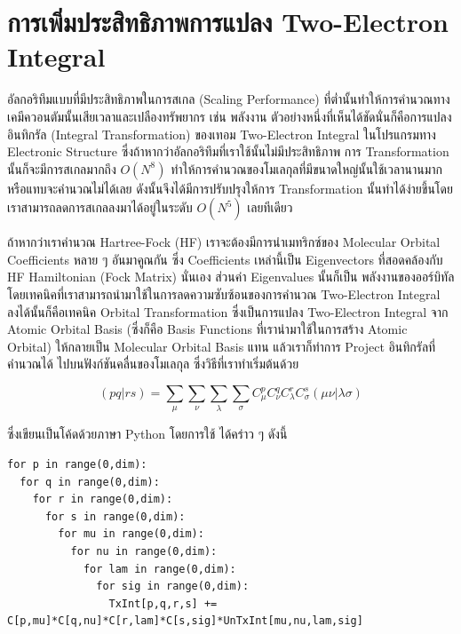 \section{การเพิ่มประสิทธิภาพการแปลง Two-Electron Integral}

อัลกอริทึมแบบที่มีประสิทธิภาพในการสเกล (Scaling Performance) ที่ต่ำนั้นทำให้การคำนวณทางเคมีควอนตัมนั้นเสียเวลาและเปลืองทรัพยากร เช่น
พลังงาน ตัวอย่างหนึ่งที่เห็นได้ชัดนั่นก็คือการแปลงอินทิกรัล (Integral Transformation) ของเทอม Two-Electron Integral ในโปรแกรมทาง
Electronic Structure ซึ่งถ้าหากว่าอัลกอริทึมที่เราใช้นั้นไม่มีประสิทธิภาพ การ Transformation นั้นก็จะมีการสเกลมากถึง $O(N^{8})$
ทำให้การคำนวณของโมเลกุลที่มีขนาดใหญ่นั้นใช้เวลานานมากหรือแทบจะคำนวณไม่ได้เลย ดังนั้นจึงได้มีการปรับปรุงให้การ Transformation
นั้นทำได้ง่ายขึ้นโดยเราสามารถลดการสเกลลงมาได้อยู่ในระดับ $O(N^{5})$ เลยทีเดียว

ถ้าหากว่าเราคำนวณ Hartree-Fock (HF) เราจะต้องมีการนำเมทริกซ์ของ Molecular Orbital Coefficients หลาย ๆ อันมาคูณกัน ซึ่ง
Coefficients เหล่านี้เป็น Eigenvectors ที่สอดคล้องกับ HF Hamiltonian (Fock Matrix) นั่นเอง ส่วนค่า Eigenvalues นั้นก็เป็น%
พลังงานของออร์บิทัล โดยเทคนิคที่เราสามารถนำมาใช้ในการลดความซับซ้อนของการคำนวณ Two-Electron Integral ลงได้นั้นก็คือเทคนิค
Orbital Transformation ซึ่งเป็นการแปลง Two-Electron Integral จาก Atomic Orbital Basis (ซึ่งก็คือ Basis Functions
ที่เรานำมาใช้ในการสร้าง Atomic Orbital) ให้กลายเป็น Molecular Orbital Basis แทน แล้วเราก็ทำการ Project อินทิกรัลที่คำนวณได้%
ไปบนฟังก์ชันคลื่นของโมเลกุล ซึ่งวิธีที่เราทำเริ่มต้นด้วย

\begin{equation}
  (pq\vert rs)
  =
  \sum_\mu \sum_\nu \sum_\lambda \sum_\sigma
  C^{p}_\mu C^{q}_\nu C^{r}_\lambda C^{s}_\sigma(\mu\nu\vert \lambda\sigma)
\end{equation}

\noindent ซึ่งเขียนเป็นโค้ดด้วยภาษา Python โดยการใช้  ได้คร่าว ๆ ดังนี้

\vspace{5pt}

\begin{lstlisting}[style=MyPython]
for p in range(0,dim):  
  for q in range(0,dim):  
    for r in range(0,dim):  
      for s in range(0,dim):  
        for mu in range(0,dim):  
          for nu in range(0,dim):  
            for lam in range(0,dim):  
              for sig in range(0,dim):  
                TxInt[p,q,r,s] += C[p,mu]*C[q,nu]*C[r,lam]*C[s,sig]*UnTxInt[mu,nu,lam,sig]
\end{lstlisting}

